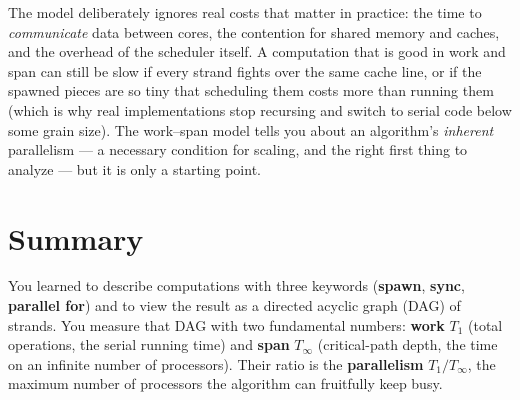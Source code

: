 \begin{remark}
The model deliberately ignores real costs that matter in practice: the time to
\emph{communicate} data between cores, the contention for shared memory and
caches, and the overhead of the scheduler itself. A computation that is good
in work and span can still be slow if every strand fights over the same cache
line, or if the spawned pieces are so tiny that scheduling them costs more than
running them (which is why real implementations stop recursing and switch to
serial code below some grain size). The work--span model tells you about an
algorithm's \emph{inherent} parallelism --- a necessary condition for scaling, and
the right first thing to analyze --- but it is only a starting point.
\end{remark}

\section{Summary}

You learned to describe computations with three keywords (\textbf{spawn},
\textbf{sync}, \textbf{parallel for}) and to view the result as a directed
acyclic graph (DAG) of strands. You measure that DAG with two fundamental numbers:
\textbf{work} $T_1$ (total operations, the serial running time) and \textbf{span}
$T_\infty$ (critical-path depth, the time on an infinite number of processors).
Their ratio is the \textbf{parallelism} $T_1/T_\infty$, the maximum number of
processors the algorithm can fruitfully keep busy.


